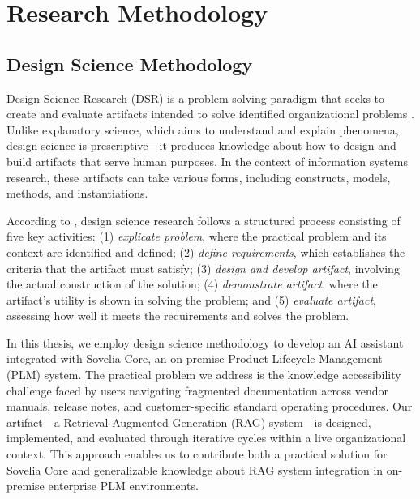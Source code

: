 \chapter{Research Methodology}
\label{ch:research-methodology}


\section{Design Science Methodology}
\label{sec:design-science-methodology}

Design Science Research (DSR) is a problem-solving paradigm that seeks to create and evaluate artifacts intended to solve identified organizational problems \parencite{johannesson_introduction_2021}. Unlike explanatory science, which aims to understand and explain phenomena, design science is prescriptive—it produces knowledge about how to design and build artifacts that serve human purposes. In the context of information systems research, these artifacts can take various forms, including constructs, models, methods, and instantiations.

According to \textcite{johannesson_introduction_2021}, design science research follows a structured process consisting of five key activities: (1) \emph{explicate problem}, where the practical problem and its context are identified and defined; (2) \emph{define requirements}, which establishes the criteria that the artifact must satisfy; (3) \emph{design and develop artifact}, involving the actual construction of the solution; (4) \emph{demonstrate artifact}, where the artifact's utility is shown in solving the problem; and (5) \emph{evaluate artifact}, assessing how well it meets the requirements and solves the problem.

In this thesis, we employ design science methodology to develop an AI assistant integrated with Sovelia Core, an on-premise Product Lifecycle Management (PLM) system. The practical problem we address is the knowledge accessibility challenge faced by users navigating fragmented documentation across vendor manuals, release notes, and customer-specific standard operating procedures. Our artifact—a Retrieval-Augmented Generation (RAG) system—is designed, implemented, and evaluated through iterative cycles within a live organizational context. This approach enables us to contribute both a practical solution for Sovelia Core and generalizable knowledge about RAG system integration in on-premise enterprise PLM environments.

